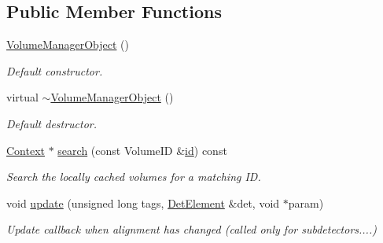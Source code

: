\subsection*{Public Member Functions}
\begin{DoxyCompactItemize}
\item 
\hyperlink{class_d_d4hep_1_1_geometry_1_1_volume_manager_object_ab52b36882ffec6a6b6023ae93f3d19bd}{Volume\+Manager\+Object} ()
\begin{DoxyCompactList}\small\item\em Default constructor. \end{DoxyCompactList}\item 
virtual \hyperlink{class_d_d4hep_1_1_geometry_1_1_volume_manager_object_a9c8a75f018315e09a2d5180cacd45468}{$\sim$\+Volume\+Manager\+Object} ()
\begin{DoxyCompactList}\small\item\em Default destructor. \end{DoxyCompactList}\item 
\hyperlink{class_d_d4hep_1_1_geometry_1_1_volume_manager_object_ac975f498c99a0933b0b5911d4fb721b3}{Context} $\ast$ \hyperlink{class_d_d4hep_1_1_geometry_1_1_volume_manager_object_a05d84aae2102afcc7e22fcfffd5cde55}{search} (const Volume\+ID \&\hyperlink{class_d_d4hep_1_1_geometry_1_1_volume_manager_object_a34cf251ba79ecddf50f9fdaf50265968}{id}) const
\begin{DoxyCompactList}\small\item\em Search the locally cached volumes for a matching ID. \end{DoxyCompactList}\item 
void \hyperlink{class_d_d4hep_1_1_geometry_1_1_volume_manager_object_a61234dfd7ac8a594ec2c9a0dcb6a274d}{update} (unsigned long tags, \hyperlink{class_d_d4hep_1_1_geometry_1_1_det_element}{Det\+Element} \&det, void $\ast$param)
\begin{DoxyCompactList}\small\item\em Update callback when alignment has changed (called only for subdetectors....) \end{DoxyCompactList}\end{DoxyCompactItemize}
